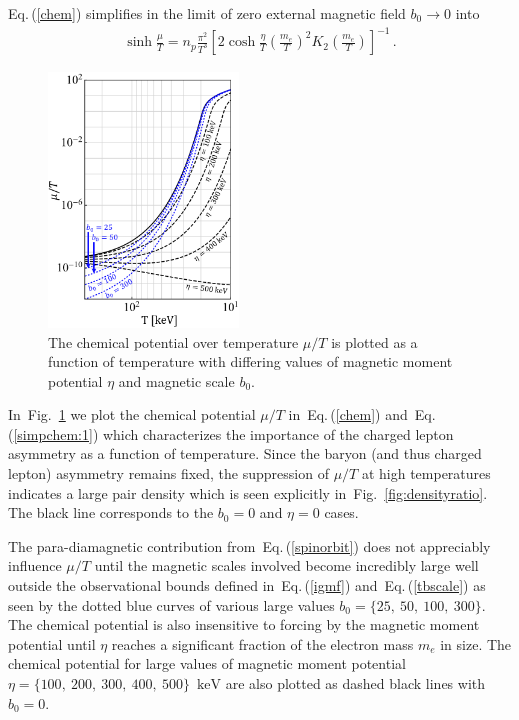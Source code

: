 \documentclass[aps,prd,floatfix,reprint]{revtex4-2}
\newcommand*{\keV}{\text{ keV}}
\newcommand{\req}[1]{Eq.\,(\ref{#1})}
\newcommand{\rf}[1]{Fig.~{\ref{#1}}}
\begin{document}
\req{chem} simplifies in the limit of zero external magnetic field $b_{0}\rightarrow0$ into
\begin{align}
 \label{simpchem:1}
 \sinh\frac{\mu}{T}=n_{p}\frac{\pi^{2}}{T^{3}}\left[2\cosh\frac{\eta}{T}\left(\frac{m_{e}}{T}\right)^{2}K_{2}\left(\frac{m_{e}}{T}\right)\right]^{-1}\,.
\end{align}

\begin{figure}[ht]
 \centering
 \includegraphics[width=0.45\textwidth]{plots/ChemicalPotential_06.png}
 \caption{The chemical potential over temperature $\mu/T$ is plotted as a function of temperature with differing values of magnetic moment potential $\eta$ and magnetic scale $b_{0}$.}
 \label{fig:chemicalpotential}
\end{figure}

In~\rf{fig:chemicalpotential} we plot the chemical potential $\mu/T$ in~\req{chem} and~\req{simpchem:1} which characterizes the importance of the charged lepton asymmetry as a function of temperature. Since the baryon (and thus charged lepton) asymmetry remains fixed, the suppression of $\mu/T$ at high temperatures indicates a large pair density which is seen explicitly in~\rf{fig:densityratio}. The black line corresponds to the $b_{0}=0$ and $\eta=0$ cases. 

The para-diamagnetic contribution from~\req{spinorbit} does not appreciably influence $\mu/T$ until the magnetic scales involved become incredibly large well outside the observational bounds defined in~\req{igmf} and~\req{tbscale} as seen by the dotted blue curves of various large values $b_{0}=\{25,\ 50,\ 100,\ 300\}$. The chemical potential is also insensitive to forcing by the magnetic moment potential until $\eta$ reaches a significant fraction of the electron mass $m_{e}$ in size. The chemical potential for large values of magnetic moment potential $\eta=\{100,\ 200,\ 300,\ 400,\ 500\}\,\keV$ are also plotted as dashed black lines with $b_{0}=0$.
\end{document}
